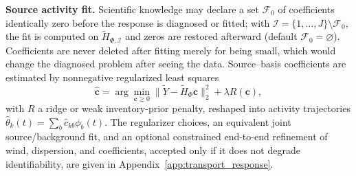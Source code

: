 \noindent\textbf{Source activity fit.}
Scientific knowledge may declare a set \(\mathcal F_0\) of coefficients identically
zero before the response is diagnosed or fitted; with
\(\mathcal I=\{1,\ldots,J\}\setminus\mathcal F_0\), the fit is computed on
\(\widetilde H_{\Phi,\mathcal I}\) and zeros are restored afterward (default
\(\mathcal F_0=\varnothing\)).  Coefficients are never deleted after fitting merely
for being small, which would change the diagnosed problem after seeing the data.
Source--basis coefficients are estimated by nonnegative regularized least squares
\begin{equation}
\widehat{\mathbf c}
=\arg\min_{\mathbf c\ge 0}
\|\widetilde Y-\widetilde H_\Phi\mathbf c\|_2^2
+\lambda R(\mathbf c),
\label{eq:nnls_estimator}
\end{equation}
with \(R\) a ridge or weak inventory-prior penalty, reshaped into activity
trajectories \(\widehat\theta_k(t)=\sum_{b}\widehat c_{kb}\phi_b(t)\).  The
regularizer choices, an equivalent joint source/background fit, and an optional
constrained end-to-end refinement of wind, dispersion, and coefficients, accepted
only if it does not degrade identifiability, are given in
Appendix~\ref{app:transport_response}.
